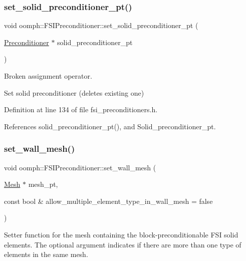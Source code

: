 \subsubsection{\texorpdfstring{set\+\_\+solid\+\_\+preconditioner\+\_\+pt()}{set\_solid\_preconditioner\_pt()}}
{\footnotesize\ttfamily void oomph\+::\+F\+S\+I\+Preconditioner\+::set\+\_\+solid\+\_\+preconditioner\+\_\+pt (\begin{DoxyParamCaption}\item[{\hyperlink{classoomph_1_1Preconditioner}{Preconditioner} $\ast$}]{solid\+\_\+preconditioner\+\_\+pt }\end{DoxyParamCaption})\hspace{0.3cm}{\ttfamily [inline]}}



Broken assignment operator. 

Set solid preconditioner (deletes existing one) 

Definition at line 134 of file fsi\+\_\+preconditioners.\+h.



References solid\+\_\+preconditioner\+\_\+pt(), and Solid\+\_\+preconditioner\+\_\+pt.

\mbox{\label{classoomph_1_1FSIPreconditioner_a61d583e9d3a1596efe22b11950fb47a5}} 
\subsubsection{\texorpdfstring{set\+\_\+wall\+\_\+mesh()}{set\_wall\_mesh()}}
{\footnotesize\ttfamily void oomph\+::\+F\+S\+I\+Preconditioner\+::set\+\_\+wall\+\_\+mesh (\begin{DoxyParamCaption}\item[{\hyperlink{classoomph_1_1Mesh}{Mesh} $\ast$}]{mesh\+\_\+pt,  }\item[{const bool \&}]{allow\+\_\+multiple\+\_\+element\+\_\+type\+\_\+in\+\_\+wall\+\_\+mesh = {\ttfamily false} }\end{DoxyParamCaption})\hspace{0.3cm}{\ttfamily [inline]}}



Setter function for the mesh containing the block-\/preconditionable F\+SI solid elements. The optional argument indicates if there are more than one type of elements in the same mesh. 




